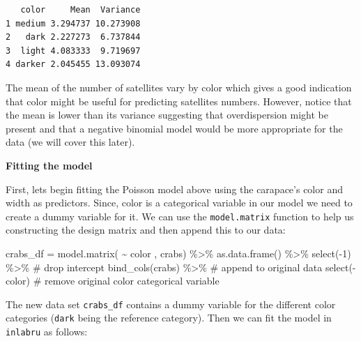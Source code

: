 \documentclass[
  letterpaper,
  DIV=11,
  numbers=noendperiod]{scrartcl}
\newenvironment{Shaded}{\begin{snugshade}}{\end{snugshade}}
\newcommand{\CommentTok}[1]{\textcolor[rgb]{0.37,0.37,0.37}{#1}}
\newcommand{\DecValTok}[1]{\textcolor[rgb]{0.68,0.00,0.00}{#1}}
\newcommand{\FunctionTok}[1]{\textcolor[rgb]{0.28,0.35,0.67}{#1}}
\newcommand{\NormalTok}[1]{\textcolor[rgb]{0.00,0.23,0.31}{#1}}
\newcommand{\OtherTok}[1]{\textcolor[rgb]{0.00,0.23,0.31}{#1}}
\newcommand{\SpecialCharTok}[1]{\textcolor[rgb]{0.37,0.37,0.37}{#1}}
\begin{document}
\begin{verbatim}
   color     Mean  Variance
1 medium 3.294737 10.273908
2   dark 2.227273  6.737844
3  light 4.083333  9.719697
4 darker 2.045455 13.093074
\end{verbatim}

The mean of the number of satellites vary by color which gives a good
indication that color might be useful for predicting satellites numbers.
However, notice that the mean is lower than its variance suggesting that
overdispersion might be present and that a negative binomial model would
be more appropriate for the data (we will cover this later).

\textbf{Fitting the model}

First, lets begin fitting the Poisson model above using the carapace's
color and width as predictors. Since, color is a categorical variable in
our model we need to create a dummy variable for it. We can use the
\texttt{model.matrix} function to help us constructing the design matrix
and then append this to our data:

\begin{Shaded}
\begin{Highlighting}[]
\NormalTok{crabs\_df }\OtherTok{=} \FunctionTok{model.matrix}\NormalTok{( }\SpecialCharTok{\textasciitilde{}}\NormalTok{  color , crabs) }\SpecialCharTok{\%\textgreater{}\%}
  \FunctionTok{as.data.frame}\NormalTok{() }\SpecialCharTok{\%\textgreater{}\%}
  \FunctionTok{select}\NormalTok{(}\SpecialCharTok{{-}}\DecValTok{1}\NormalTok{) }\SpecialCharTok{\%\textgreater{}\%}        \CommentTok{\# drop intercept}
  \FunctionTok{bind\_cols}\NormalTok{(crabs) }\SpecialCharTok{\%\textgreater{}\%}  \CommentTok{\# append to original data}
  \FunctionTok{select}\NormalTok{(}\SpecialCharTok{{-}}\NormalTok{color)        }\CommentTok{\# remove original color categorical variable}
\end{Highlighting}
\end{Shaded}

The new data set \texttt{crabs\_df} contains a dummy variable for the
different color categories (\texttt{dark} being the reference category).
Then we can fit the model in \texttt{inlabru} as follows:
\end{document}
